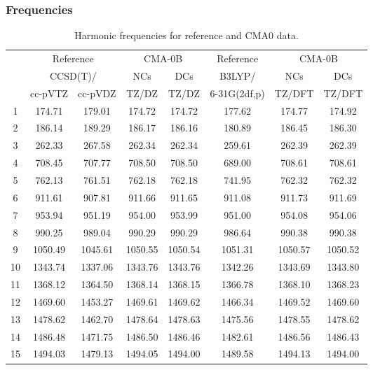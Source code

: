 \documentclass[10pt,oneside]{article}
\begin{document}
\subsubsection*{Frequencies}
\begin{table}[h!]
\centering
\caption{Harmonic frequencies for reference and CMA0 data.}
\begin{tabular}{cccccccc}
\toprule
{} & \multicolumn{2}{c}{Reference} & \multicolumn{2}{c}{CMA-0B} &    Reference & \multicolumn{2}{c}{CMA-0B} \\
{} & \multicolumn{2}{c}{CCSD(T)/} &     NCs &     DCs &       B3LYP/ &     NCs &     DCs \\
{} &   cc-pVTZ & cc-pVDZ &   TZ/DZ &   TZ/DZ & 6-31G(2df,p) &  TZ/DFT &  TZ/DFT \\
\midrule
1  &    174.71 &  179.01 &  174.72 &  174.72 &       177.62 &  174.77 &  174.92 \\
2  &    186.14 &  189.29 &  186.17 &  186.16 &       180.89 &  186.45 &  186.30 \\
3  &    262.33 &  267.58 &  262.34 &  262.34 &       259.61 &  262.39 &  262.39 \\
4  &    708.45 &  707.77 &  708.50 &  708.50 &       689.00 &  708.61 &  708.61 \\
5  &    762.13 &  761.51 &  762.18 &  762.18 &       741.95 &  762.32 &  762.32 \\
6  &    911.61 &  907.81 &  911.66 &  911.65 &       911.08 &  911.73 &  911.69 \\
7  &    953.94 &  951.19 &  954.00 &  953.99 &       951.00 &  954.08 &  954.06 \\
8  &    990.25 &  989.04 &  990.29 &  990.29 &       986.64 &  990.38 &  990.38 \\
9  &   1050.49 & 1045.61 & 1050.55 & 1050.54 &      1051.31 & 1050.57 & 1050.52 \\
10 &   1343.74 & 1337.06 & 1343.76 & 1343.76 &      1342.26 & 1343.69 & 1343.80 \\
11 &   1368.12 & 1364.50 & 1368.14 & 1368.15 &      1366.78 & 1368.10 & 1368.23 \\
12 &   1469.60 & 1453.27 & 1469.61 & 1469.62 &      1466.34 & 1469.52 & 1469.60 \\
13 &   1478.62 & 1462.70 & 1478.64 & 1478.63 &      1475.56 & 1478.55 & 1478.62 \\
14 &   1486.48 & 1471.75 & 1486.50 & 1486.46 &      1482.61 & 1486.56 & 1486.43 \\
15 &   1494.03 & 1479.13 & 1494.05 & 1494.00 &      1489.58 & 1494.13 & 1494.00 \\

\end{tabular}
\end{table}
\end{document}
